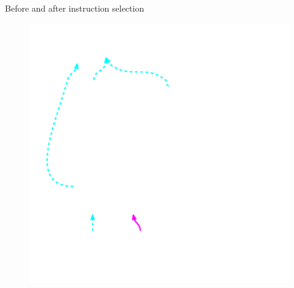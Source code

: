 
\begin{frame}{Before and after instruction selection}

\begin{minipage}[t]{0.50\linewidth}
    \begin{figure}
        \includegraphics[width = 1.00\textwidth]{examples/ex1b/ex1b-pre-isel.pdf}
    \end{figure}
\end{minipage}
\begin{minipage}[t]{0.49\linewidth}
    \begin{figure}

\end{figure}
\end{minipage}
\end{frame}

